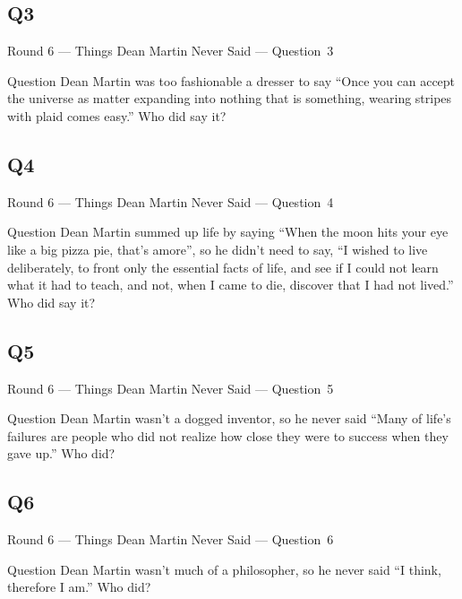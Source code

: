 \documentclass[11pt]{beamer}
\begin{document}
\subsection*{Q3}
\begin{frame}[t]{Round 6 --- Things Dean Martin Never Said --- \mbox{Question 3}}
\vspace{-0.5em}
\begin{block}{Question}
Dean Martin was too fashionable a dresser to say ``Once you can accept the universe as matter expanding into nothing that is something, wearing stripes with plaid comes easy.'' Who did say it?
\end{block}
\end{frame}
\subsection*{Q4}
\begin{frame}[t]{Round 6 --- Things Dean Martin Never Said --- \mbox{Question 4}}
\vspace{-0.5em}
\begin{block}{Question}
Dean Martin summed up life by saying ``When the moon hits your eye like a big pizza pie, that's amore'', so he didn't need to say, ``I wished to live deliberately, to front only the essential facts of life, and see if I could not learn what it had to teach, and not, when I came to die, discover that I had not lived.'' Who did say it?
\end{block}
\end{frame}
\subsection*{Q5}
\begin{frame}[t]{Round 6 --- Things Dean Martin Never Said --- \mbox{Question 5}}
\vspace{-0.5em}
\begin{block}{Question}
Dean Martin wasn't a dogged inventor, so he never said ``Many of life's failures are people who did not realize how close they were to success when they gave up.'' Who did?
\end{block}
\end{frame}
\subsection*{Q6}
\begin{frame}[t]{Round 6 --- Things Dean Martin Never Said --- \mbox{Question 6}}
\vspace{-0.5em}
\begin{block}{Question}
Dean Martin wasn't much of a philosopher, so he never said ``I think, therefore I am.'' Who did?
\end{block}
\end{frame}
\end{document}

